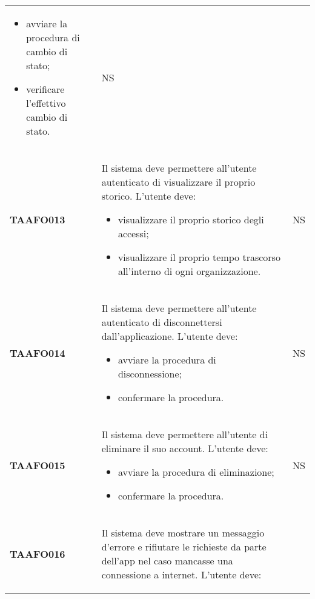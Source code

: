 \documentclass[../piano-di-qualifica.tex]{subfiles}
\begin{document}
\begin{centering}
\begin{longtable}[H]{>{\centering\bfseries}m{3cm} >{}p{10cm} >{\centering\arraybackslash}m{3cm}}
\begin{itemize}
                        \item avviare la procedura di cambio di stato;
                        \item verificare l'effettivo cambio di stato.
                      \end{itemize}
                      & NS \\ 
        TAAFO013      & Il sistema deve permettere all’utente autenticato di visualizzare il proprio storico. \newline 
                      L’utente deve:  
                      \begin{itemize} 
                        \item visualizzare il proprio storico degli accessi;
                        \item visualizzare il proprio tempo trascorso all'interno di ogni organizzazione.
                      \end{itemize}
                      & NS \\ 
        TAAFO014      & Il sistema deve permettere all’utente autenticato di disconnettersi dall’applicazione. \newline 
                      L’utente deve:  
                      \begin{itemize} 
                        \item avviare la procedura di disconnessione;
                        \item confermare la procedura.
                      \end{itemize}
                      & NS \\ 
        TAAFO015      & Il sistema deve permettere all’utente di eliminare il suo account. \newline 
                      L’utente deve:  
                      \begin{itemize} 
                        \item avviare la procedura di eliminazione;
                        \item confermare la procedura.
                      \end{itemize}
                      & NS \\ 
        TAAFO016      & Il sistema deve mostrare un messaggio d’errore e rifiutare le richieste da parte dell’app nel caso mancasse una connessione a internet. \newline 
                      L’utente deve:  
                      \begin{itemize} 

\end{itemize}
\end{longtable}
\end{centering}
\end{document}
